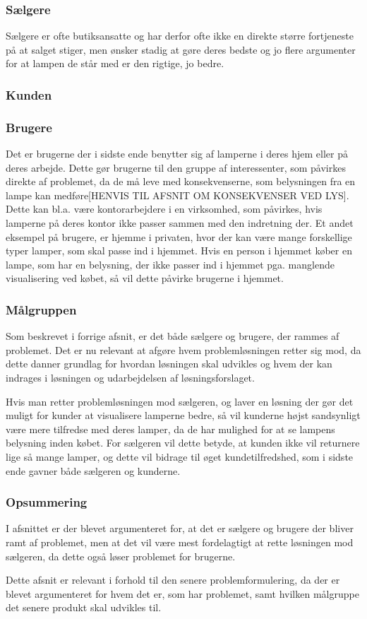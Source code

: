 \subsubsection{Sælgere}
Sælgere er ofte butiksansatte og har derfor ofte ikke en direkte større fortjeneste på at salget stiger, men ønsker stadig at gøre deres bedste og jo flere argumenter for at lampen de står med er den rigtige, jo bedre.

\subsubsection{Kunden}

\subsubsection{Brugere}
Det er brugerne der i sidste ende benytter sig af lamperne i deres hjem eller på deres arbejde. Dette gør brugerne til den gruppe af interessenter, som påvirkes direkte af problemet, da de må leve med konsekvenserne, som belysningen fra en lampe kan medføre[HENVIS TIL AFSNIT OM KONSEKVENSER VED LYS]. Dette kan bl.a. være kontorarbejdere i en virksomhed, som påvirkes, hvis lamperne på deres kontor ikke passer sammen med den indretning der. Et andet eksempel på brugere, er hjemme i privaten, hvor der kan være mange forskellige typer lamper, som skal passe ind i hjemmet. Hvis en person i hjemmet køber en lampe, som har en belysning, der ikke passer ind i hjemmet pga. manglende visualisering ved købet, så vil dette påvirke brugerne i hjemmet. 

\subsubsection{Målgruppen}
Som beskrevet i forrige afsnit, er det både sælgere og brugere, der rammes af problemet. Det er nu relevant at afgøre hvem problemløsningen retter sig mod, da dette danner grundlag for hvordan løsningen skal udvikles og hvem der kan indrages i løsningen og udarbejdelsen af løsningsforslaget. 


Hvis man retter problemløsningen mod sælgeren, og laver en løsning der gør det muligt for kunder at visualisere lamperne bedre, så vil kunderne højst sandsynligt være mere tilfredse med deres lamper, da de har mulighed for at se lampens belysning inden købet. For sælgeren vil dette betyde, at kunden ikke vil returnere lige så mange lamper, og dette vil bidrage til øget kundetilfredshed, som i sidste ende gavner både sælgeren og kunderne.

\subsubsection*{Opsummering}
I afsnittet er der blevet argumenteret for, at det er sælgere og brugere der bliver ramt af problemet, men at det vil være mest fordelagtigt at rette løsningen mod sælgeren, da dette også løser problemet for brugerne.

Dette afsnit er relevant i forhold til den senere problemformulering, da der er blevet argumenteret for hvem det er, som har problemet, samt hvilken målgruppe det senere produkt skal udvikles til.
